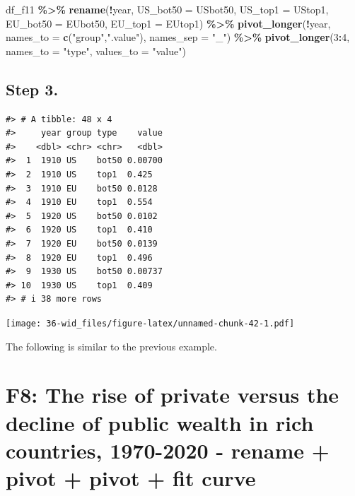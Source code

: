 \documentclass[
  xelatex, ja=standard]{bxjsbook}
\newenvironment{Shaded}{\begin{snugshade}}{\end{snugshade}}
\newcommand{\AttributeTok}[1]{\textcolor[rgb]{0.13,0.29,0.53}{#1}}
\newcommand{\DecValTok}[1]{\textcolor[rgb]{0.00,0.00,0.81}{#1}}
\newcommand{\FunctionTok}[1]{\textcolor[rgb]{0.13,0.29,0.53}{\textbf{#1}}}
\newcommand{\NormalTok}[1]{#1}
\newcommand{\SpecialCharTok}[1]{\textcolor[rgb]{0.81,0.36,0.00}{\textbf{#1}}}
\newcommand{\StringTok}[1]{\textcolor[rgb]{0.31,0.60,0.02}{#1}}
\theoremstyle{definition}
\theoremstyle{definition}
\theoremstyle{definition}
\theoremstyle{definition}
\theoremstyle{remark}
\begin{document}
\begin{Shaded}
\begin{Highlighting}[]
\NormalTok{df\_f11 }\SpecialCharTok{\%\textgreater{}\%} 
  \FunctionTok{rename}\NormalTok{(}\SpecialCharTok{!}\NormalTok{year, }\AttributeTok{US\_bot50 =}\NormalTok{ USbot50, }\AttributeTok{US\_top1 =}\NormalTok{ UStop1, }
         \AttributeTok{EU\_bot50 =}\NormalTok{ EUbot50, }\AttributeTok{EU\_top1 =}\NormalTok{ EUtop1) }\SpecialCharTok{\%\textgreater{}\%}
  \FunctionTok{pivot\_longer}\NormalTok{(}\SpecialCharTok{!}\NormalTok{year, }\AttributeTok{names\_to =} \FunctionTok{c}\NormalTok{(}\StringTok{"group"}\NormalTok{,}\StringTok{".value"}\NormalTok{), }
               \AttributeTok{names\_sep =} \StringTok{"\_"}\NormalTok{) }\SpecialCharTok{\%\textgreater{}\%}
  \FunctionTok{pivot\_longer}\NormalTok{(}\DecValTok{3}\SpecialCharTok{:}\DecValTok{4}\NormalTok{, }\AttributeTok{names\_to =} \StringTok{"type"}\NormalTok{, }\AttributeTok{values\_to =} \StringTok{"value"}\NormalTok{) }
\end{Highlighting}
\end{Shaded}

\hypertarget{step-3.-1}{%
\subsection{Step 3.}\label{step-3.-1}}

\begin{verbatim}
#> # A tibble: 48 x 4
#>     year group type    value
#>    <dbl> <chr> <chr>   <dbl>
#>  1  1910 US    bot50 0.00700
#>  2  1910 US    top1  0.425  
#>  3  1910 EU    bot50 0.0128 
#>  4  1910 EU    top1  0.554  
#>  5  1920 US    bot50 0.0102 
#>  6  1920 US    top1  0.410  
#>  7  1920 EU    bot50 0.0139 
#>  8  1920 EU    top1  0.496  
#>  9  1930 US    bot50 0.00737
#> 10  1930 US    top1  0.409  
#> # i 38 more rows
\end{verbatim}

\texttt{[image: 36-wid\_files/figure-latex/unnamed-chunk-42-1.pdf]}

The following is similar to the previous example.

\hypertarget{f8-the-rise-of-private-versus-the-decline-of-public-wealth-in-rich-countries-1970-2020---rename-pivot-pivot-fit-curve}{%
\section{F8: The rise of private versus the decline of public wealth in rich countries, 1970-2020 - rename + pivot + pivot + fit curve}\label{f8-the-rise-of-private-versus-the-decline-of-public-wealth-in-rich-countries-1970-2020---rename-pivot-pivot-fit-curve}}
\end{document}
